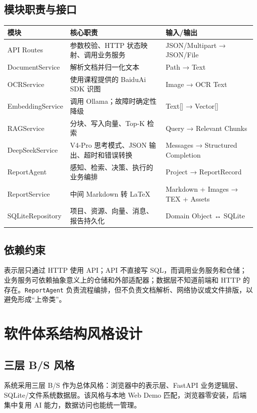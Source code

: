 \documentclass[12pt,a4paper]{ctexart}
\begin{document}
\subsection{模块职责与接口}
\begin{table}[H]
\centering\small
\begin{tabularx}{\textwidth}{|X|X|X|}
\hline
\textbf{模块} & \textbf{核心职责} & \textbf{输入/输出} \\ \hline
API Routes & 参数校验、HTTP 状态映射、调用业务服务 & JSON/Multipart → JSON/File \\ \hline
DocumentService & 解析文档并归一化文本 & Path → Text \\ \hline
OCRService & 使用课程提供的 BaiduAi SDK 识图 & Image → OCR Text \\ \hline
EmbeddingService & 调用 Ollama；故障时确定性降级 & Text[] → Vector[] \\ \hline
RAGService & 分块、写入向量、Top-K 检索 & Query → Relevant Chunks \\ \hline
DeepSeekService & V4-Pro 思考模式、JSON 输出、超时和错误转换 & Messages → Structured Completion \\ \hline
ReportAgent & 感知、检索、决策、执行的业务编排 & Project → ReportRecord \\ \hline
ReportService & 中间 Markdown 转 LaTeX & Markdown + Images → TEX + Assets \\ \hline
SQLiteRepository & 项目、资源、向量、消息、报告持久化 & Domain Object ↔ SQLite \\ \hline
\end{tabularx}
\end{table}
\subsection{依赖约束}
表示层只通过 HTTP 使用 API；API 不直接写 SQL，而调用业务服务和仓储；业务服务可依赖抽象意义上的仓储和外部适配器；数据层不知道前端和 HTTP 的存在。\texttt{ReportAgent} 负责流程编排，但不负责文档解析、网络协议或文件排版，以避免形成“上帝类”。

\section{软件体系结构风格设计}
\subsection{三层 B/S 风格}
系统采用三层 B/S 作为总体风格：浏览器中的表示层、FastAPI 业务逻辑层、SQLite/文件系统数据层。该风格与本地 Web Demo 匹配，浏览器零安装，后端集中复用 AI 能力，数据访问也能统一管理。
\end{document}
